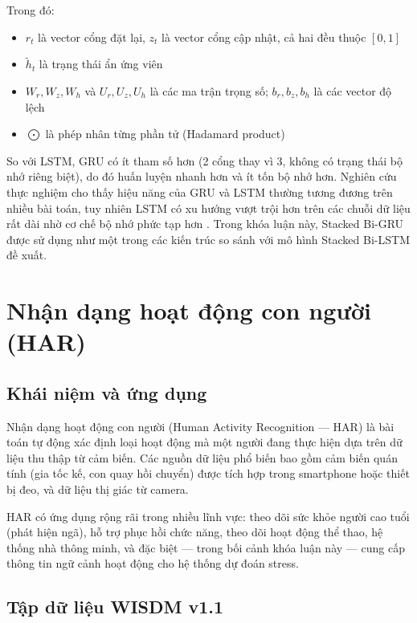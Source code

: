 Trong đó:
\begin{itemize}
    \item $r_t$ là vector cổng đặt lại, $z_t$ là vector cổng cập nhật, cả hai đều thuộc $[0, 1]$
    \item $\tilde{h}_t$ là trạng thái ẩn ứng viên
    \item $W_r, W_z, W_h$ và $U_r, U_z, U_h$ là các ma trận trọng số; $b_r, b_z, b_h$ là các vector độ lệch
    \item $\bigodot$ là phép nhân từng phần tử (Hadamard product)
\end{itemize}

So với LSTM, GRU có ít tham số hơn (2 cổng thay vì 3, không có trạng thái bộ nhớ riêng biệt), do đó huấn luyện nhanh hơn và ít tốn bộ nhớ hơn. Nghiên cứu thực nghiệm cho thấy hiệu năng của GRU và LSTM thường tương đương trên nhiều bài toán, tuy nhiên LSTM có xu hướng vượt trội hơn trên các chuỗi dữ liệu rất dài nhờ cơ chế bộ nhớ phức tạp hơn \cite{chung2014empirical}. Trong khóa luận này, Stacked Bi-GRU được sử dụng như một trong các kiến trúc so sánh với mô hình Stacked Bi-LSTM đề xuất.


\section{Nhận dạng hoạt động con người (HAR)}
\label{sec:har}

\subsection{Khái niệm và ứng dụng}

Nhận dạng hoạt động con người (Human Activity Recognition — HAR) là bài toán tự động xác định loại hoạt động mà một người đang thực hiện dựa trên dữ liệu thu thập từ cảm biến. Các nguồn dữ liệu phổ biến bao gồm cảm biến quán tính (gia tốc kế, con quay hồi chuyển) được tích hợp trong smartphone hoặc thiết bị đeo, và dữ liệu thị giác từ camera.

HAR có ứng dụng rộng rãi trong nhiều lĩnh vực: theo dõi sức khỏe người cao tuổi (phát hiện ngã), hỗ trợ phục hồi chức năng, theo dõi hoạt động thể thao, hệ thống nhà thông minh, và đặc biệt — trong bối cảnh khóa luận này — cung cấp thông tin ngữ cảnh hoạt động cho hệ thống dự đoán stress.

\subsection{Tập dữ liệu WISDM v1.1}

